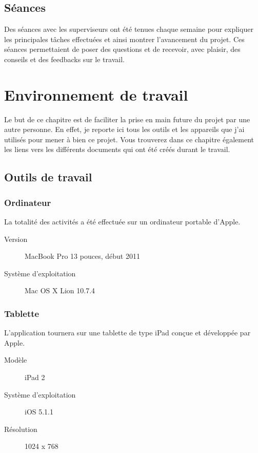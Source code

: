 \section{Séances} %
\label{sec:s_ances}
Des séances avec les superviseurs ont été tenues chaque semaine pour expliquer les principales tâches effectuées et ainsi montrer l'avancement du projet. Ces séances permettaient de poser des questions et de recevoir, avec plaisir, des conseils et des feedbacks sur le travail.



\chapter{Environnement de travail} %
\label{cha:environnement_de_travail}

Le but de ce chapitre est de faciliter la prise en main future du projet par une autre personne. En effet, je reporte ici tous les outils et les appareils que j'ai utilisés pour mener à bien ce projet. Vous trouverez dans ce chapitre également les liens vers les différents documents qui ont été créés durant le travail.

\section{Outils de travail} %
\label{sec:outils_de_travail}

\subsection{Ordinateur} %
\label{sub:macbook_pro}
La totalité des activités a été effectuée sur un ordinateur portable d'Apple.

\begin{description}
	\item[Version] MacBook Pro 13 pouces, début 2011
	\item [Système d'exploitation] Mac OS X Lion 10.7.4 
\end{description}

\subsection{Tablette} %
\label{sub:tablette}
L'application tournera sur une tablette de type iPad conçue et développée par Apple.

\begin{description}
	\item[Modèle] iPad 2
	\item [Système d’exploitation] iOS 5.1.1
	\item [Résolution] 1024 x 768 
\end{description}

